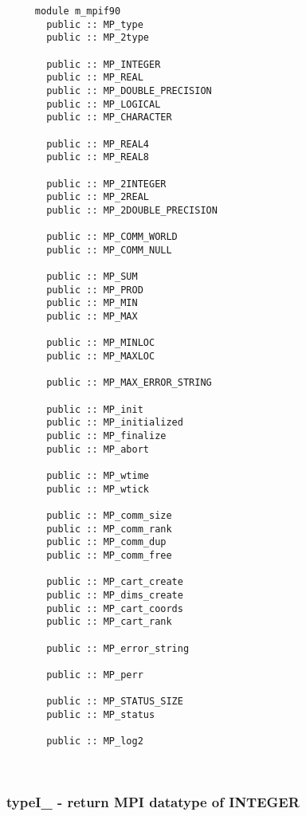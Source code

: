 \begin{verbatim} 
     module m_mpif90
       public :: MP_type
       public :: MP_2type
 
       public :: MP_INTEGER
       public :: MP_REAL
       public :: MP_DOUBLE_PRECISION
       public :: MP_LOGICAL
       public :: MP_CHARACTER
 
       public :: MP_REAL4
       public :: MP_REAL8
 
       public :: MP_2INTEGER
       public :: MP_2REAL
       public :: MP_2DOUBLE_PRECISION
 
       public :: MP_COMM_WORLD
       public :: MP_COMM_NULL
 
       public :: MP_SUM
       public :: MP_PROD
       public :: MP_MIN
       public :: MP_MAX
 
       public :: MP_MINLOC
       public :: MP_MAXLOC
 
       public :: MP_MAX_ERROR_STRING
 
       public :: MP_init
       public :: MP_initialized
       public :: MP_finalize
       public :: MP_abort
 
       public :: MP_wtime
       public :: MP_wtick
 
       public :: MP_comm_size
       public :: MP_comm_rank
       public :: MP_comm_dup
       public :: MP_comm_free
 
       public :: MP_cart_create
       public :: MP_dims_create
       public :: MP_cart_coords
       public :: MP_cart_rank
 
       public :: MP_error_string
 
       public :: MP_perr
 
       public :: MP_STATUS_SIZE
       public :: MP_status
 
       public :: MP_log2
 \end{verbatim}%
 
 
\mbox{}\hrulefill\ 

  \subsubsection{typeI\_ - return MPI datatype of INTEGER}


